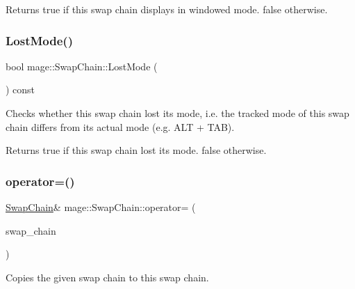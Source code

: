 \begin{DoxyReturn}{Returns}
{\ttfamily true} if this swap chain displays in windowed mode. {\ttfamily false} otherwise. 
\end{DoxyReturn}
\hypertarget{classmage_1_1_swap_chain_aba3697d2b641b99f7e89fcc59613f89d}{}\label{classmage_1_1_swap_chain_aba3697d2b641b99f7e89fcc59613f89d} 
\subsubsection{\texorpdfstring{Lost\+Mode()}{LostMode()}}
{\footnotesize\ttfamily bool mage\+::\+Swap\+Chain\+::\+Lost\+Mode (\begin{DoxyParamCaption}{ }\end{DoxyParamCaption}) const\hspace{0.3cm}{\ttfamily [noexcept]}}

Checks whether this swap chain lost its mode, i.\+e. the tracked mode of this swap chain differs from its actual mode (e.\+g. A\+LT + T\+AB).

\begin{DoxyReturn}{Returns}
{\ttfamily true} if this swap chain lost its mode. {\ttfamily false} otherwise. 
\end{DoxyReturn}
\hypertarget{classmage_1_1_swap_chain_a8ea6de219f37d447487d7d3b4bbd5867}{}\label{classmage_1_1_swap_chain_a8ea6de219f37d447487d7d3b4bbd5867} 
\subsubsection{\texorpdfstring{operator=()}{operator=()}\hspace{0.1cm}{\footnotesize\ttfamily [1/2]}}
{\footnotesize\ttfamily \hyperlink{classmage_1_1_swap_chain}{Swap\+Chain}\& mage\+::\+Swap\+Chain\+::operator= (\begin{DoxyParamCaption}\item[{const \hyperlink{classmage_1_1_swap_chain}{Swap\+Chain} \&}]{swap\+\_\+chain }\end{DoxyParamCaption})\hspace{0.3cm}{\ttfamily [delete]}}

Copies the given swap chain to this swap chain.


